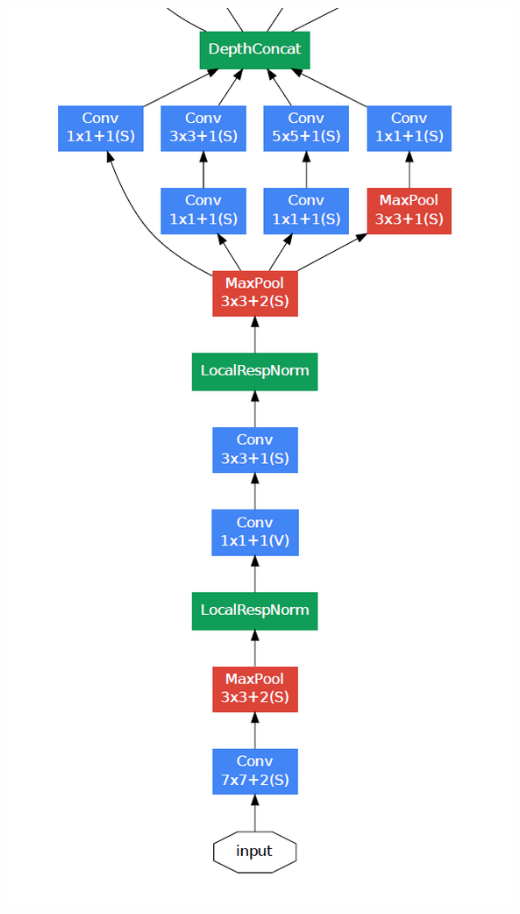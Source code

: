 \begin{frame}[allowframebreaks]
\begin{columns}
			\begin{column}{.2\textwidth}
			\begin{center}
				\includegraphics[scale=0.5]{figs/GoogleNet_scheme_2}
			\end{center}	
		\end{column}%
	

\end{columns}
\end{frame}
